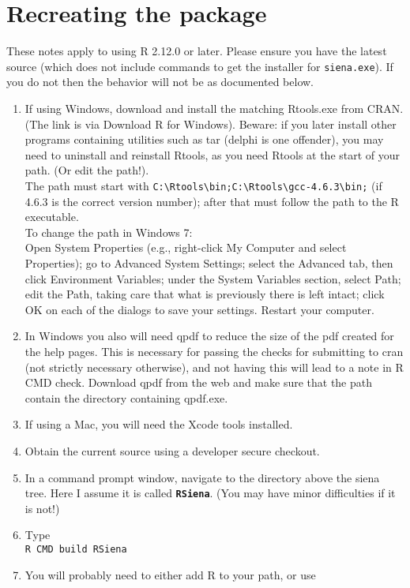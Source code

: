 \documentclass[12pt, a4paper]{article}
\renewcommand{\=}{\,=\,}
\newcommand{\+}{\,+\,}
\newcommand{\sfn}[1]{\textbf{\texttt{#1}}}
\begin{document}
\section{Recreating the package}
These notes apply to using R 2.12.0 or later. Please ensure you have the
latest source (which does not include commands to get the installer for
\verb|siena.exe|). If you do not then the behavior will not be as documented
below.
\begin{enumerate}
\item If using Windows, download and install the matching
\textsf{Rtools.exe} from
  CRAN. (The link is via Download R for Windows). Beware: if you later install
  other programs containing utilities such as tar (delphi is one offender), you
  may need to uninstall and reinstall Rtools, as you need Rtools at the start of
  your path. (Or edit the path!).\\
  The path must start with
  \verb|C:\Rtools\bin;C:\Rtools\gcc-4.6.3\bin;|
  (if 4.6.3 is the correct version number);
  after that must follow the path to the R executable.\\
  To change the path in Windows 7:\\
  Open System Properties (e.g., right-click My Computer and select Properties);
   go to Advanced System Settings;
    select the Advanced tab, then click Environment Variables;
    under the System Variables section, select Path;
    edit the Path, taking care that what is previously there is left intact;
    click OK on each of the dialogs to save your settings.
    Restart your computer.
\item In Windows you also will need qpdf to reduce the size of the pdf
    created for the help pages.
    This is necessary for passing the checks for  submitting to cran (not strictly
    necessary otherwise), and not having this will lead to a note in R CMD check.
    Download qpdf from the web and make sure that the path contain the directory
    containing qpdf.exe.
\item If using a Mac, you will need the Xcode tools installed.
\item Obtain the current source using a developer secure checkout.
\item In a command prompt window, navigate to the directory above the siena
  tree. Here I assume it is called \sfn{RSiena}. (You may have minor
  difficulties if it is not!)
\item Type\\
\verb|R CMD build RSiena|
\item You will probably need to either add R to your path, or use

\end{enumerate}
\end{document}
